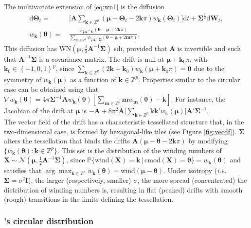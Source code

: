 \documentclass[oneside,11pt]{article}
\newcommand{\Z}{\mathbb{Z}}
\newcommand{\rd}{\mathrm{d}}
\newcommand{\bm}{\mathbf{m}}
\newcommand{\bX}{\mathbf{X}}
\newcommand{\bmu}{\boldsymbol\mu}
\newcommand{\bk}{\mathbf{k}}
\newcommand{\zero}{\mathbf{0}}
\newcommand{\btheta}{\boldsymbol\theta}
\newcommand{\bTheta}{\boldsymbol\Theta}
\newcommand{\bSigma}{\boldsymbol\Sigma}
\newcommand{\bA}{\mathbf{A}}
\newcommand{\bI}{\mathbf{I}}
\newcommand{\bW}{\mathbf{W}}
\newcommand{\lrp}[1]{\left(#1\right)}
\newcommand{\lrc}[1]{\left[#1\right]}
\newcommand{\lrb}[1]{\left\{#1\right\}}
\newcommand{\cmod}[1]{\mathrm{cmod}\left(#1\right)}
\begin{document}
The multivariate extension of \eqref{eq:wn1} is the diffusion
\begin{align}
\rd \bTheta_t=&\,\bigg[\bA\sum_{\bk\in\Z^p}\lrp{\bmu-\bTheta_t-2\bk\pi} w_{\bk}(\bTheta_t)\bigg]\rd t +\bSigma^\frac{1}{2}\rd \bW_t,\label{eq:wnp}\\
w_{\bk}(\btheta)=&\,\frac{ \phi_{\frac{1}{2}\bA^{-1}\bSigma}(\btheta-\bmu+2\bk\pi)}{\sum_{\bm\in\Z^p} \phi_{\frac{1}{2}\bA^{-1}\bSigma}(\btheta-\bmu+2\bm\pi)}.\nonumber
\end{align}
This diffusion has $\mathrm{WN}\lrp{\bmu,\frac{1}{2}\bA^{-1}\bSigma}$ sdi, provided that $\bA$ is invertible and such that $\bA^{-1}\bSigma$ is a covariance matrix. The drift is null at $\bmu+\bk_0\pi$, with $\bk_0\in\lrb{-1,0,1}^p$, since $\sum_{\bk\in\Z^p}(2\bk+\bk_0) w_{\bk}(\bmu+\bk_0\pi)=\zero$ due to the symmetry of $w_{\bk}(\bmu)$ as a function of $\bk\in\Z^p$. Properties similar to the circular case can be obtained using that $\nabla w_{\bk}(\btheta)=4\pi\bSigma^{-1}\bA  w_{\bk}(\btheta)\lrc{\sum_{\bm\in\Z^p}\bm w_{\bm}(\btheta)-\bk}$. For instance, the Jacobian of the drift at $\bmu$ is $-\bA+8\pi^2\bA\big[\sum_{\bk\in\Z^p}\bk\bk'w_{\bk}(\bmu)\big]\allowbreak\bA'\bSigma^{-1}$.\\

The vector field of the drift has a characteristic tessellated structure that, in the two-dimensional case, is formed by hexagonal-like tiles (see Figure \ref{fig:vecdf}). $\bSigma$ alters the tessellation that binds the drifts $\bA(\bmu-\btheta-2\bk\pi)$ by modifying $\{w_{\bk}(\btheta):\bk\in\Z^p\}$. This set is the distribution of the winding numbers of $\bX\sim\mathcal{N}(\bmu,\frac{1}{2}\bA^{-1}\bSigma)$, since
$\mathbb{P}\{\mathrm{wind}(\bX)=\bk\,|\,\cmod{\bX}=\btheta\}=w_\bk(\btheta)$ and satisfies that $\arg\max_{\bk\in\Z^p}w_{\bk}(\btheta)=\mathrm{wind}(\bmu-\btheta)$. Under isotropy (\textit{i.e.} $\bSigma=\sigma^2\bI$), the larger (respectively, smaller) $\sigma$, the more spread (concentrated) the distribution of winding numbers is, resulting in flat (peaked) drifts with smooth (rough) transitions in the limits defining the tessellation.

\subsubsection{\texorpdfstring{\cite{Jones2005}'s circular distribution}{Jones and Pewsey (2005)'s circular distribution}}
\end{document}
